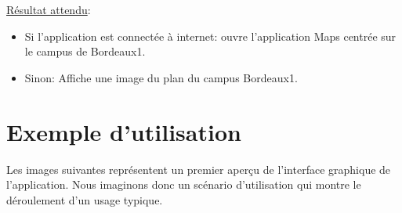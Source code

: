 \documentclass [pdftex,12pt] {report}
\begin{document}
    \underline{Résultat attendu}:
    \begin{itemize}
    \item Si l'application est connectée à internet: ouvre l'application Maps centrée sur le campus de Bordeaux1.
    \item Sinon: Affiche une image du plan du campus Bordeaux1.
    \end{itemize}


\chapter{Exemple d'utilisation}

Les images suivantes représentent un premier aperçu de l'interface graphique de l'application. Nous imaginons donc un scénario d'utilisation qui montre le déroulement d'un usage typique. 
\end{document}
